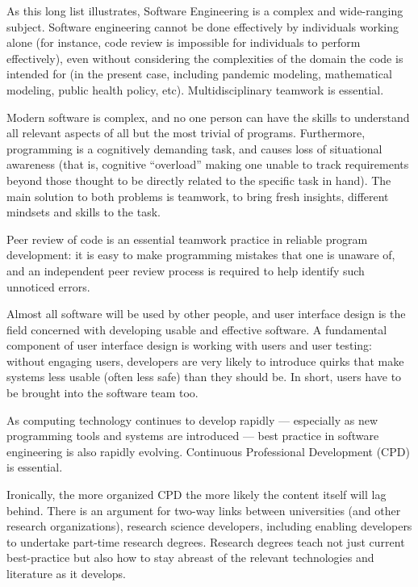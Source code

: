 \documentclass{article}
\begin{document}

As this long list illustrates, Software Engineering is a complex and wide-ranging subject. Software engineering cannot be done effectively by individuals working alone (for instance, code review is impossible for individuals to perform effectively), even without considering the complexities of the domain the code is intended for (in the present case, including pandemic modeling, mathematical modeling, public health policy, etc). Multidisciplinary teamwork is essential.

Modern software is complex, and no one person can have the skills to understand all relevant aspects of all but the most trivial of programs. Furthermore, programming is a cognitively demanding task, and causes loss of situational awareness (that is, cognitive ``overload'' making one unable to track requirements beyond those thought to be directly related to the specific task in hand). The main solution to both problems is teamwork, to bring fresh insights, different mindsets and skills to the task.
 
Peer review of code is an essential teamwork practice in reliable program development: \cite{peerReview,knight} it is easy to make programming mistakes that one is unaware of, and an independent peer review process is required to help identify such unnoticed errors. 

Almost all software will be used by other people, and user interface design is the field concerned with developing usable and effective software. A fundamental component of user interface design is working with users and user testing: without engaging users, developers are very likely to introduce quirks that make systems less usable (often less safe) than they should be. In short, users have to be brought into the software team too.


As computing technology continues to develop rapidly --- especially as new programming tools and systems are introduced --- best practice in software engineering is also rapidly evolving. Continuous Professional Development (CPD) is essential. 

Ironically, the more organized CPD the more likely the content itself will lag behind. There is an argument for two-way links between universities (and other research organizations), research science developers, including enabling developers to undertake part-time research degrees. Research degrees teach not just current best-practice but also how to stay abreast of the relevant technologies and literature as it develops.
\end{document}
